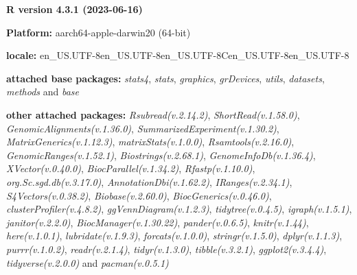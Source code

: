 \documentclass[
]{book}
\begin{document}
\textbf{R version 4.3.1 (2023-06-16)}

\textbf{Platform:} aarch64-apple-darwin20 (64-bit)

\textbf{locale:}
en\_US.UTF-8\textbar\textbar en\_US.UTF-8\textbar\textbar en\_US.UTF-8\textbar\textbar C\textbar\textbar en\_US.UTF-8\textbar\textbar en\_US.UTF-8

\textbf{attached base packages:}
\emph{stats4}, \emph{stats}, \emph{graphics}, \emph{grDevices}, \emph{utils}, \emph{datasets}, \emph{methods} and \emph{base}

\textbf{other attached packages:}
\emph{Rsubread(v.2.14.2)}, \emph{ShortRead(v.1.58.0)}, \emph{GenomicAlignments(v.1.36.0)}, \emph{SummarizedExperiment(v.1.30.2)}, \emph{MatrixGenerics(v.1.12.3)}, \emph{matrixStats(v.1.0.0)}, \emph{Rsamtools(v.2.16.0)}, \emph{GenomicRanges(v.1.52.1)}, \emph{Biostrings(v.2.68.1)}, \emph{GenomeInfoDb(v.1.36.4)}, \emph{XVector(v.0.40.0)}, \emph{BiocParallel(v.1.34.2)}, \emph{Rfastp(v.1.10.0)}, \emph{org.Sc.sgd.db(v.3.17.0)}, \emph{AnnotationDbi(v.1.62.2)}, \emph{IRanges(v.2.34.1)}, \emph{S4Vectors(v.0.38.2)}, \emph{Biobase(v.2.60.0)}, \emph{BiocGenerics(v.0.46.0)}, \emph{clusterProfiler(v.4.8.2)}, \emph{ggVennDiagram(v.1.2.3)}, \emph{tidytree(v.0.4.5)}, \emph{igraph(v.1.5.1)}, \emph{janitor(v.2.2.0)}, \emph{BiocManager(v.1.30.22)}, \emph{pander(v.0.6.5)}, \emph{knitr(v.1.44)}, \emph{here(v.1.0.1)}, \emph{lubridate(v.1.9.3)}, \emph{forcats(v.1.0.0)}, \emph{stringr(v.1.5.0)}, \emph{dplyr(v.1.1.3)}, \emph{purrr(v.1.0.2)}, \emph{readr(v.2.1.4)}, \emph{tidyr(v.1.3.0)}, \emph{tibble(v.3.2.1)}, \emph{ggplot2(v.3.4.4)}, \emph{tidyverse(v.2.0.0)} and \emph{pacman(v.0.5.1)}
\end{document}
